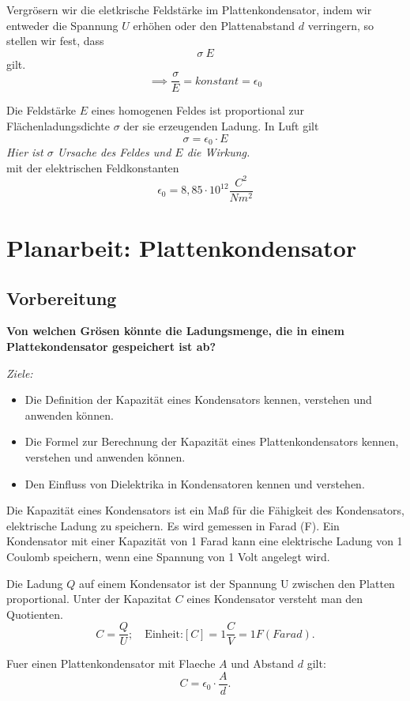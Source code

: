 \documentclass[a4paper]{report}
\begin{document}
Vergr\"osern wir die eletkrische Feldst\"arke im Plattenkondensator, indem wir
entweder die Spannung $U$ erh\"ohen oder den Plattenabstand $d$ verringern, so
stellen wir fest, dass \[\sigma ~ E\] gilt. \[\implies \frac{\sigma}{E}=konstant=\epsilon_0\]

\begin{tcolorbox}[colback=red!10!white,colframe=red!75!black]
Die Feldst\"arke $E$ eines homogenen Feldes ist proportional zur
Fl\"achenladungsdichte $\sigma$ der sie erzeugenden Ladung. In Luft gilt
\[\sigma = \epsilon_0 \cdot E\] \textit{Hier ist $\sigma$ Ursache des Feldes und $E$ die Wirkung.}\\
mit der elektrischen Feldkonstanten \[\epsilon_0 = 8,85 \cdot 10^{12} \frac{C^2}{Nm^2}\]
\end{tcolorbox}


\section{Planarbeit: Plattenkondensator}
\subsection{Vorbereitung}
\textbf{Von welchen Gr\"osen k\"onnte die Ladungsmenge, die in einem
Plattekondensator gespeichert ist ab?}

\textit{Ziele: }
\begin{itemize}
  \item Die Definition der Kapazität eines Kondensators kennen, verstehen und anwenden können.
  \item Die Formel zur Berechnung der Kapazität eines Plattenkondensators kennen, verstehen und anwenden können.
  \item Den Einfluss von Dielektrika in Kondensatoren kennen und verstehen.
\end{itemize}

Die Kapazität eines Kondensators ist ein Maß für die Fähigkeit des
Kondensators, elektrische Ladung zu speichern. Es wird gemessen in Farad (F).
Ein Kondensator mit einer Kapazität von 1 Farad kann eine elektrische Ladung
von 1 Coulomb speichern, wenn eine Spannung von 1 Volt angelegt wird.


Die Ladung $Q$ auf einem Kondensator ist der Spannung U zwischen den Platten
proportional. Unter der Kapazitat $C$ eines Kondensator versteht man den
Quotienten.
\[C=\frac{Q}{U}; \quad \text{Einheit:} [C]=1 \frac{C}{V} = 1F (Farad).\]

Fuer einen Plattenkondensator mit Flaeche $A$ und Abstand $d$ gilt: 
\[C=\epsilon_0 \cdot \frac{A}{d}.\]
\end{document}
